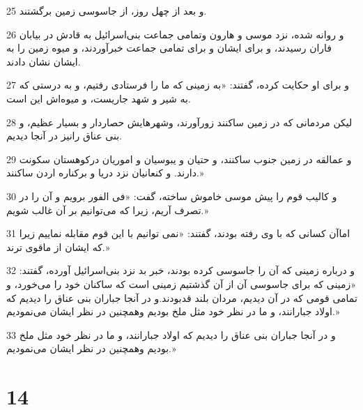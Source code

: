 \par 25 و بعد از چهل روز، از جاسوسی زمین برگشتند.
\par 26 و روانه شده، نزد موسی و هارون وتمامی جماعت بنی‌اسرائیل به قادش در بیابان فاران رسیدند، و برای ایشان و برای تمامی جماعت خبر‌آوردند، و میوه زمین را به ایشان نشان دادند.
\par 27 و برای او حکایت کرده، گفتند: «به زمینی که ما را فرستادی رفتیم، و به درستی که به شیر و شهد جاریست، و میوه‌اش این است.
\par 28 لیکن مردمانی که در زمین ساکنند زورآورند، وشهرهایش حصاردار و بسیار عظیم، و بنی عناق رانیز در آنجا دیدیم.
\par 29 و عمالقه در زمین جنوب ساکنند، و حتیان و یبوسیان و اموریان درکوهستان سکونت دارند. و کنعانیان نزد دریا و برکناره اردن ساکنند.»
\par 30 و کالیب قوم را پیش موسی خاموش ساخته، گفت: «فی الفور برویم و آن را در تصرف آریم، زیرا که می‌توانیم بر آن غالب شویم.»
\par 31 اماآن کسانی که با وی رفته بودند، گفتند: «نمی توانیم با این قوم مقابله نماییم زیرا که ایشان از ماقوی ترند.»
\par 32 و درباره زمینی که آن را جاسوسی کرده بودند، خبر بد نزد بنی‌اسرائیل آورده، گفتند: «زمینی که برای جاسوسی آن از آن گذشتیم زمینی است که ساکنان خود را می‌خورد، و تمامی قومی که در آن دیدیم، مردان بلند قدبودند.و در آنجا جباران بنی عناق را دیدیم که اولاد جبارانند، و ما در نظر خود مثل ملخ بودیم وهمچنین در نظر ایشان می‌نمودیم.»
\par 33 و در آنجا جباران بنی عناق را دیدیم که اولاد جبارانند، و ما در نظر خود مثل ملخ بودیم وهمچنین در نظر ایشان می‌نمودیم.»
 
\chapter{14}

